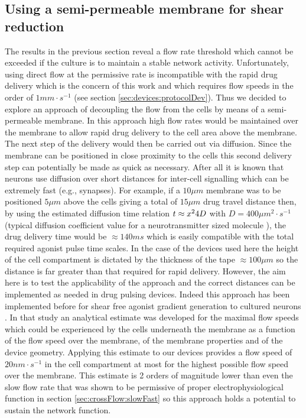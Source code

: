         \subsection{Using a semi-permeable membrane for shear reduction}
        \label{sec:crossFlow:membrane}
        The results in the previous section reveal a flow rate threshold which cannot be exceeded if the culture is to maintain a stable network activity. Unfortunately, using direct flow at the permissive rate is incompatible with the rapid drug delivery which is the concern of this work and which requires flow speeds in the order of \(1 mm\cdot s^{-1}\) (see section \ref{sec:devices:protocolDev}). Thus we decided to explore an approach of decoupling the flow from the cells by means of a semi-permeable membrane. In this approach high flow rates would be maintained over the membrane to allow rapid drug delivery to the cell area above the membrane. The next step of the delivery would then be carried out via diffusion. Since the membrane can be positioned in close proximity to the cells this second delivery step can potentially be made as quick as necessary. After all it is known that neurons use diffusion over short distances for inter-cell signalling which can be extremely fast (e.g., synapses). For example, if a \(10 \mu m\) membrane was to be positioned \(5 \mu m\) above the cells giving a total of \(15 \mu m\) drug travel distance then, by using the estimated diffusion time relation \(t\approx x^2\\4D\) with \(D=400 \mu m^2\cdot s^{-1}\) (typical diffusion coefficient value for a neurotransmitter sized molecule \cite{johnstoneThesis}), the drug delivery time would be \(\approx 140 ms\) which is easily compatible with the total required agonist pulse time scales. In the case of the devices used here the height of the cell compartment is dictated by the thickness of the tape \(\approx 100\mu m\) so the distance is far greater than that required for rapid delivery. However, the aim here is to test the applicability of the approach and the correct distances can be implemented as needed in drug pulsing devices. Indeed this approach has been implemented before for shear free agonist gradient generation to cultured neurons \cite{morel2012amplification,morel2012concentration}. In that study an analytical estimate was developed for the maximal flow speeds which could be experienced by the cells underneath the membrane as a function of the flow speed over the membrane, of the membrane properties and of the device geometry. Applying this estimate to our devices provides a flow speed of \(20 nm\cdot s^{-1}\) in the cell compartment at most for the highest possible flow speed over the membrane. This estimate is 2 orders of magnitude lower than even the slow flow rate that was shown to be permissive of proper electrophysiological function in section \ref{sec:crossFlow:slowFast} so this approach holds a potential to sustain the network function.

